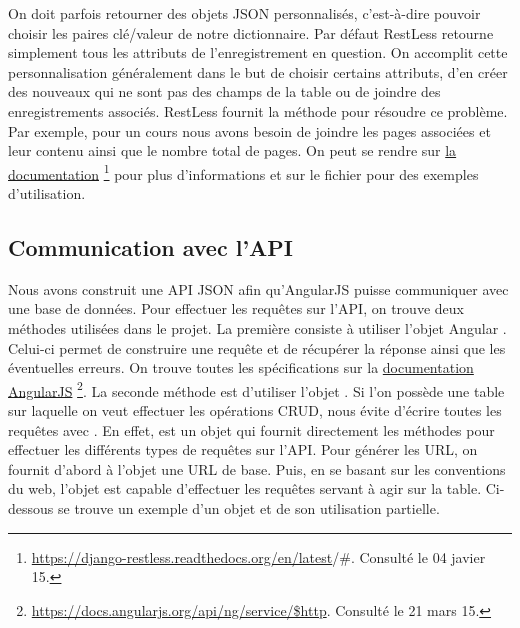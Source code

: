 \documentclass[a4paper,10pt,twoside]{sphinxmanual}
\begin{document}
On doit parfois retourner des objets JSON personnalisés, c'est-à-dire pouvoir choisir les paires clé/valeur de notre dictionnaire. Par défaut RestLess retourne simplement tous les attributs de l'enregistrement en question. On accomplit cette personnalisation généralement dans le but de choisir certains attributs, d'en créer des nouveaux qui ne sont pas des champs de la table ou de joindre des enregistrements associés. RestLess fournit la méthode  pour résoudre ce problème. Par exemple, pour un cours nous avons besoin de joindre les pages associées et leur contenu ainsi que le nombre total de pages. On peut se rendre sur \href{https://django-restless.readthedocs.org/en/latest/\#}{la documentation} \footnote{
\href{https://django-restless.readthedocs.org/en/latest}{https://django-restless.readthedocs.org/en/latest}/\#. Consulté le 04 javier 15.
} pour plus d'informations et sur le fichier  pour des exemples d'utilisation.


\subsection{Communication avec l'API}
\label{restless:communication-avec-l-api}
Nous avons construit une API JSON afin qu'AngularJS puisse communiquer avec une base de données. Pour effectuer les requêtes sur l'API, on trouve deux méthodes utilisées dans le projet. La première consiste à utiliser l'objet Angular . Celui-ci permet de construire une requête et de récupérer la réponse ainsi que les éventuelles erreurs. On trouve toutes les spécifications sur la \href{https://docs.angularjs.org/api/ng/service/\$http}{documentation AngularJS} \footnote{
\href{https://docs.angularjs.org/api/ng/service/\$http}{https://docs.angularjs.org/api/ng/service/\$http}. Consulté le 21 mars 15.
}. La seconde méthode est d'utiliser l'objet . Si l'on possède une table sur laquelle on veut effectuer les opérations CRUD,  nous évite d'écrire toutes les requêtes avec . En effet,  est un objet qui fournit directement les méthodes pour effectuer les différents types de requêtes sur l'API. Pour générer les URL, on fournit d'abord à l'objet une URL de base. Puis, en se basant sur les conventions du web, l'objet est capable d'effectuer les requêtes servant à agir sur la table. Ci-dessous se trouve un exemple d'un objet  et de son utilisation partielle.
\end{document}
